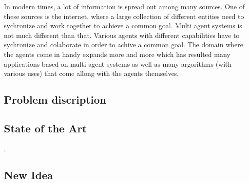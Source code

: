 In modern times, a lot of information is spread out among many sources.
One of these sources is the internet, where a large collection of different entities need to sychronize and work together to achieve a common goal. Multi agent systems is not much different than that. Various agents with different capabilities have to sychronize and colaborate in order to achive a common goal. The domain where the agents come in handy expands more and more which has resulted many applications based on multi agent systems as well as many argorithms (with various uses) that come allong with the agents themselves.
\subsection{Problem discription}



\subsection{State of the Art}
\cite{intframe}.
\subsection{New Idea}
